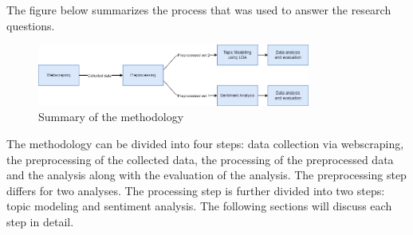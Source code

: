 The figure below summarizes the process that was used to answer the research questions.

\begin{figure}[h]
    \centering
    \includegraphics[width=0.8\textwidth]{resources/methodology.png}
    \caption{Summary of the methodology}
    \label{fig:methodology}
\end{figure}

The methodology can be divided into four steps: data collection via webscraping, the preprocessing of the collected data, the processing of the preprocessed data and the analysis along with the evaluation of the analysis. The preprocessing step differs for two analyses. The processing step is further divided into two steps: topic modeling and sentiment analysis. The following sections will discuss each step in detail.